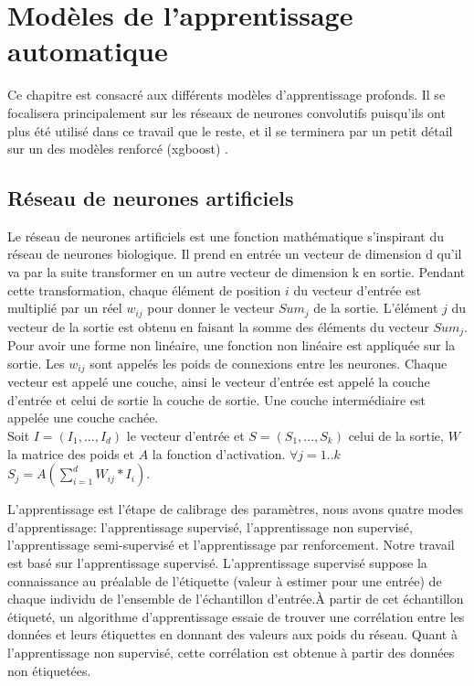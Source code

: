 \chapter{Modèles de l'apprentissage automatique}\label{chapitre2}
Ce chapitre est consacré aux différents modèles d'apprentissage profonds. Il se focalisera principalement sur les réseaux de neurones convolutifs puisqu'ils ont plus été utilisé dans ce travail que le reste, et il se terminera par un petit détail sur un des modèles renforcé (xgboost) . 
\section{Réseau de neurones artificiels}\label{section12}%
Le réseau de neurones artificiels est une fonction mathématique s'inspirant du réseau de neurones biologique. Il prend en entrée un vecteur de dimension d qu'il va par la suite transformer en un autre vecteur de dimension k en sortie. Pendant cette transformation, chaque élément de position $i$ du vecteur d'entrée est multiplié par un réel $w_{ij}$ pour donner le vecteur $Sum_j$ de la sortie. L'élément $j$ du vecteur de la sortie est obtenu en faisant la somme des éléments du vecteur $Sum_j$. Pour avoir une forme non linéaire, une fonction non linéaire est appliquée sur la sortie. Les $w_{ij}$ sont appelés les poids de connexions entre les neurones. Chaque vecteur est appelé une couche, ainsi le vecteur d'entrée est appelé la couche d'entrée et celui de sortie la couche de sortie. Une couche intermédiaire est appelée une couche cachée.\\
Soit $I = (I_1, ..., I_d)$ le vecteur d'entrée et $S = (S_1,...,S_k) $ celui de la sortie, $W$ la matrice des poids et $A$ la fonction d'activation. $\forall j = 1..k$ $S_j = A(\sum \limits_{i=1}^d W_{ij}*I_i) $.

L'apprentissage est l'étape de calibrage des paramètres, nous avons quatre modes d'apprentissage: l'apprentissage supervisé, l'apprentissage non supervisé, l'apprentissage semi-supervisé et l'apprentissage par renforcement. Notre travail est basé sur l'apprentissage supervisé.
L'apprentissage supervisé suppose la connaissance au préalable de l'étiquette (valeur à estimer pour une entrée) de chaque individu de l'ensemble de l'échantillon d'entrée.À partir de cet échantillon étiqueté, un algorithme d'apprentissage essaie de trouver une corrélation entre les données et leurs étiquettes en donnant des valeurs aux poids du réseau. Quant à l'apprentissage non supervisé, cette corrélation est obtenue à partir des données non étiquetées.

